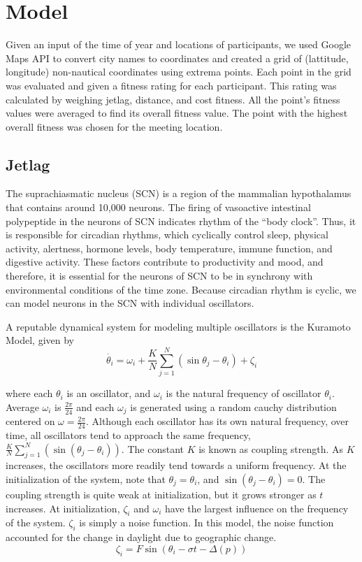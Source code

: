 \section{Model}
Given an input of the time of year and locations of participants, we used Google Maps API to convert city names to coordinates and created a grid of (lattitude, longitude) non-nautical coordinates using extrema points. Each point in the grid was evaluated and given a fitness rating for each participant. This rating was calculated by weighing jetlag, distance, and cost fitness. All the point's fitness values were averaged to find its overall fitness value. The point with the highest overall fitness was chosen for the meeting location.

\subsection{Jetlag}
The suprachiasmatic nucleus (SCN) is a region of the mammalian hypothalamus that contains around 10,000 neurons. The firing of vasoactive intestinal polypeptide in the neurons of SCN indicates rhythm of the ``body clock''. Thus, it is responsible for circadian rhythms, which cyclically control sleep, physical activity, alertness, hormone levels, body temperature, immune function, and digestive activity. These factors contribute to productivity and mood, and therefore, it is essential for the neurons of SCN to be in synchrony with environmental conditions of the time zone. Because circadian rhythm is cyclic, we can model neurons in the SCN with individual oscillators.

A reputable dynamical system for modeling multiple oscillators is the Kuramoto Model, given by
$$\dot{\theta_i} = \omega_i + \frac{K}{N} \sum_{j=1}^ {N}(\sin{\theta_j - \theta_i}) + \zeta_i$$

where each $\theta_i$ is an oscillator, and $\omega_i$ is the natural frequency of oscillator $\theta_i$. Average $\omega_i$ is $\frac{2 \pi}{24}$ and each $\omega_j$ is generated using a random cauchy distribution centered on $\omega = \frac{2 \pi}{24}$. Although each oscillator has its own natural frequency, over time, all oscillators tend to approach the same frequency, $\frac{K}{N} \sum_{j=1}^N(\sin (\theta_j -\theta_i))$. The constant $K$ is known as coupling strength. As $K$ increases, the oscillators more readily tend towards a uniform frequency. At the initialization of the system, note that $\theta_j = \theta_i$, and $\sin(\theta_j - \theta_i) = 0$. The coupling strength is quite weak at initialization, but it grows stronger as $t$ increases. At initialization, $\zeta_i$ and $\omega_i$ have the largest influence on the frequency of the system. $\zeta_i$ is simply a noise function. In this model, the noise function accounted for the change in daylight due to geographic change. 
$$\zeta_i = F \sin(\theta_i - \sigma t - \Delta(p))$$ 

